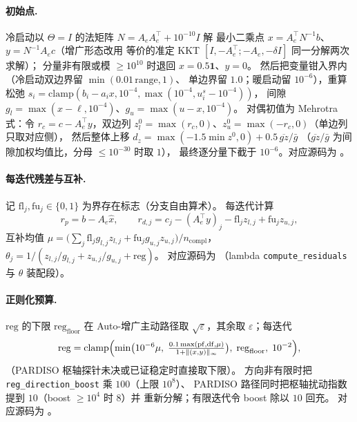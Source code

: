 \paragraph{初始点.}
冷启动以 $\Theta = I$ 的法矩阵 $N = A_e A_e^{\top} + 10^{-10} I$ 解
最小二乘点 $x = A_e^{\top} N^{-1} b$、$y = N^{-1} A_e c$（增广形态改用
等价的准定 KKT $[I, -A_e^{\top}; -A_e, -\delta I]$ 同一分解两次求解）；
分量非有限或模 $\ge 10^{10}$ 时退回 $x = 0.5\mathbf{1}$、$y = 0$。
然后把变量钳入界内（冷启动双边界留 $\min(0.01\,\mathrm{range}, 1)$、
单边界留 $1.0$；暖启动留 $10^{-6}$），重算松弛
$s_i = \mathrm{clamp}(b_i - a_i x, 10^{-4}, \max(10^{-4}, u^{s}_i - 10^{-4}))$，
间隙 $g_l = \max(x - \ell, 10^{-4})$、$g_u = \max(u - x, 10^{-4})$。
对偶初值为 Mehrotra 式：令 $r_c = c - A_e^{\top} y$，双边列
$z_l^{0} = \max(r_c, 0)$、$z_u^{0} = \max(-r_c, 0)$（单边列只取对应侧），
然后整体上移 $d_z = \max(-1.5 \min z^{0}, 0) + 0.5\, \overline{g z}/\bar g$
（$\overline{gz}/\bar g$ 为间隙加权均值比，分母 $\le 10^{-30}$ 时取 $1$），
最终逐分量下截于 $10^{-6}$。对应源码为
。

\paragraph{每迭代残差与互补.}
记 $\mathrm{fl}_j, \mathrm{fu}_j \in \{0, 1\}$ 为界存在标志（分支自由算术）。
每迭代计算
\begin{equation}
  r_p = b - A_e \hat x,\qquad
  r_{d,j} = c_j - (A_e^{\top} y)_j - \mathrm{fl}_j z_{l,j}
  + \mathrm{fu}_j z_{u,j},
  \label{eq:ipmlp:residuals}
\end{equation}
互补均值 $\mu = \bigl(\sum_j \mathrm{fl}_j g_{l,j} z_{l,j} +
\mathrm{fu}_j g_{u,j} z_{u,j}\bigr) / n_{\text{compl}}$，
$\theta_j = 1 / (z_{l,j}/g_{l,j} + z_{u,j}/g_{u,j} + \mathrm{reg})$。
对应源码为 
（lambda \texttt{compute\_residuals} 与 $\theta$ 装配段）。

\paragraph{正则化预算.}
$\mathrm{reg}$ 的下限 $\mathrm{reg}_{\text{floor}}$ 在 Auto-增广主动路径取
$\sqrt{\varepsilon}$，其余取 $\varepsilon$；每迭代
\begin{equation}
  \mathrm{reg} = \mathrm{clamp}\Bigl(
  \min\bigl(10^{-6} \mu,\;
  \tfrac{0.1 \max(\mathrm{pf}, \mathrm{df}, \mu)}{1 + \|(x,y)\|_{\infty}}
  \bigr),\; \mathrm{reg}_{\text{floor}},\; 10^{-2}\Bigr),
  \label{eq:ipmlp:reg}
\end{equation}
（PARDISO 枢轴探针未决或已证稳定时直接取下限）。
方向非有限时把 \texttt{reg\_direction\_boost} 乘 $100$（上限 $10^{8}$）、
PARDISO 路径同时把枢轴扰动指数提到 $10$（boost $\ge 10^{4}$ 时 $8$）并
重新分解；有限迭代令 boost 除以 $10$ 回充。
对应源码为 。

